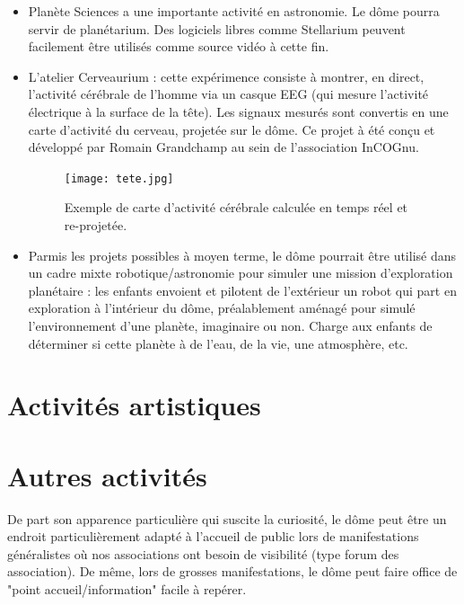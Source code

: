 \documentclass[a4paper,12pt]{report}
\begin{document}
\begin{itemize}
	\item Planète Sciences a une importante activité en astronomie. Le dôme
	pourra servir de planétarium. Des logiciels libres comme Stellarium peuvent
	facilement être utilisés comme source vidéo à cette fin.

	\item L'atelier Cerveaurium : cette expérimence consiste à montrer, en
	direct, l'activité cérébrale de l'homme via un casque EEG (qui mesure
	l'activité électrique à la surface de la tête). Les signaux mesurés sont
	convertis en une carte d'activité du cerveau, projetée sur le dôme. Ce
	projet à été conçu et développé par Romain Grandchamp au sein de
	l'association InCOGnu.

    \begin{figure}[!h]
    \centering
    \texttt{[image: tete.jpg]}
	\caption{Exemple de carte d'activité cérébrale calculée en temps réel et re-projetée.}
    \end{figure}


	\item Parmis les projets possibles à moyen terme, le dôme pourrait être
	utilisé dans un cadre mixte robotique/astronomie pour simuler une mission
	d'exploration planétaire : les enfants envoient et pilotent de l'extérieur
	un robot qui part en exploration à l'intérieur du dôme, préalablement
	aménagé pour simulé l'environnement d'une planète, imaginaire ou non.
	Charge aux enfants de déterminer si cette planète à de l'eau, de la vie,
	une atmosphère, etc.

\end{itemize}

\section{Activités artistiques}

\section{Autres activités}

De part son apparence particulière qui suscite la curiosité, le dôme peut être
un endroit particulièrement adapté à l'accueil de public lors de manifestations
généralistes où nos associations ont besoin de visibilité (type forum des
association). De même, lors de grosses manifestations, le dôme peut faire
office de "point accueil/information" facile à repérer.
\end{document}
